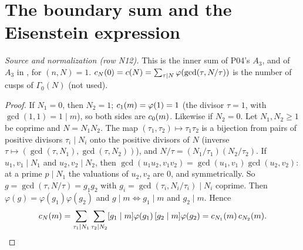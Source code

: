 \section{The boundary sum and the Eisenstein expression}\label{sec:ef-boundary}

\begin{definition}
\end{definition}
\noindent \emph{Source and normalization (row N12).} This is the inner sum of P04's $A_3$, and of $A_3$ in \cite[Thm.~12.4.11]{CoSt},
\cite[Thm.~4.9]{Ass} for $(n,N)=1$. $c_N(0)=c(N)=\sum_{\tau\mid N}\varphi(\gcd(\tau,N/\tau))$ is the number of cusps of $\Gamma_0(N)$
\cite[Remark~1, p.~72]{CO} (not used).

\begin{theorem}
\end{theorem}
\begin{proof}
If $N_1=0$, then $N_2=1$; $c_1(m)=\varphi(1)=1$ (the divisor $\tau=1$, with $\gcd(1,1)=1\mid m$), so both sides are $c_0(m)$. Likewise if
$N_2=0$. Let $N_1,N_2\ge1$ be coprime and $N=N_1N_2$. The map $(\tau_1,\tau_2)\mapsto\tau_1\tau_2$ is a bijection from pairs of positive divisors
$\tau_i\mid N_i$ onto the positive divisors of $N$ (inverse $\tau\mapsto(\gcd(\tau,N_1),\gcd(\tau,N_2))$), and $N/\tau=(N_1/\tau_1)(N_2/\tau_2)$. If
$u_1,v_1\mid N_1$ and $u_2,v_2\mid N_2$, then $\gcd(u_1u_2,v_1v_2)=\gcd(u_1,v_1)\gcd(u_2,v_2)$: at a prime $p\mid N_1$ the valuations of $u_2,v_2$ are
$0$, and symmetrically. So $g=\gcd(\tau,N/\tau)=g_1g_2$ with $g_i=\gcd(\tau_i,N_i/\tau_i)\mid N_i$ coprime. Then $\varphi(g)=\varphi(g_1)\varphi(g_2)$
and $g\mid m\iff g_1\mid m$ and $g_2\mid m$. Hence
\[
  c_N(m)=\sum_{\tau_1\mid N_1}\sum_{\tau_2\mid N_2}[g_1\mid m]\varphi(g_1)\,[g_2\mid m]\varphi(g_2)=c_{N_1}(m)\,c_{N_2}(m). \qedhere
\]
\end{proof}

